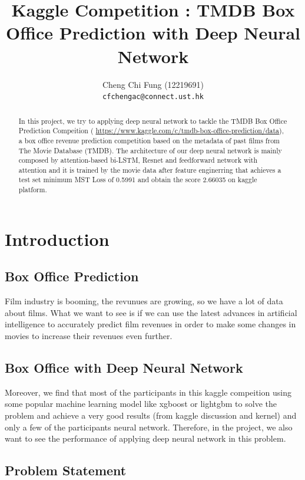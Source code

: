 \documentclass{article}
\title{Kaggle Competition : TMDB Box Office Prediction with Deep Neural Network}
\author{%
	Cheng Chi Fung (12219691)\\
	\texttt{cfchengac@connect.ust.hk} \\
}
\begin{document}
\maketitle

\begin{abstract}
In this project, we try to applying deep neural network to tackle the TMDB Box Office Prediction Compeition ( \url{https://www.kaggle.com/c/tmdb-box-office-prediction/data}), a box office revenue prediction competition based on the metadata of past films from The Movie Database (TMDB). The architecture of our deep neural network is mainly composed by attention-based bi-LSTM, Resnet and feedforward network with attention and it is trained by the movie data after feature enginerring that achieves a test set minimum MST Loss of 0.5991 and obtain the score 2.66035 on kaggle platform.
\end{abstract}

\section{Introduction}

\subsection{Box Office Prediction}
Film industry is booming, the revunues are growing, so we have a lot of data about films. What we want to see is if we can use the latest advances in artificial intelligence to accurately predict film revenues in order to make some changes in movies to increase their revenues even further.

\subsection{Box Office with Deep Neural Network} 

Moreover, we find that most of the participants in this kaggle compeition using some popular machine learning model like xgboost or lightgbm to solve the problem and achieve a very good results (from kaggle discussion and kernel) and only a few of the participants neural network. Therefore, in the project, we also want to see the performance of applying deep neural network in this problem.

\subsection{Problem Statement}
\end{document}

